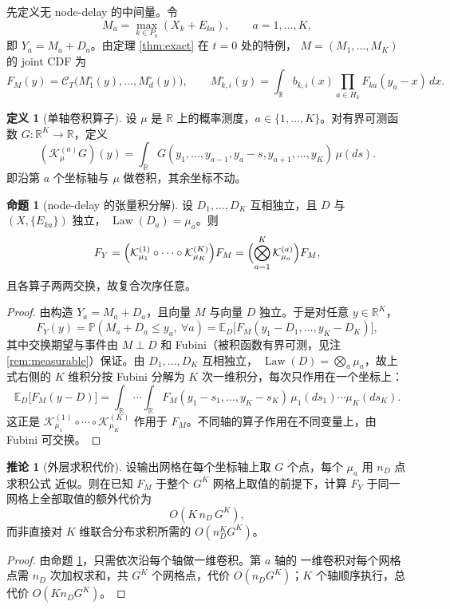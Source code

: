 \documentclass[a4paper,11pt]{article}
\theoremstyle{definition}
\newtheorem{corollary}{推论}
\newtheorem{proposition}{命题}
\newtheorem{definition}{定义}
\newcommand{\R}{\mathbb R}
\newcommand{\E}{\mathbb E}
\newcommand{\Prob}{\mathbb P}
\newcommand{\1}{\mathbf 1}
\newcommand{\Law}{\operatorname{Law}}
\begin{document}
先定义无 node-delay 的中间量。令
\[
M_a=\max_{k\in P_a}(X_k+E_{ka}),
\qquad a=1,\ldots,K,
\]
即 $Y_a=M_a+D_a$。由定理 \ref{thm:exact} 在 $t=0$ 处的特例，
$M=(M_1,\ldots,M_K)$ 的 joint CDF 为
\[
F_M(y)
=
\mathcal C_T\bigl(M_1^{\circ}(y),\ldots,M_d^{\circ}(y)\bigr),
\qquad
M_{k,i}^{\circ}(y)
=
\int_\R b_{k,i}(x)\prod_{a\in H_k}F_{ka}(y_a-x)\,dx.
\]

\begin{definition}[单轴卷积算子]
设 $\mu$ 是 $\R$ 上的概率测度，$a\in\{1,\ldots,K\}$。对有界可测函数
$G:\R^K\to\R$，定义
\[
(\mathcal K_\mu^{(a)}G)(y)
=
\int_\R G(y_1,\ldots,y_{a-1},y_a-s,y_{a+1},\ldots,y_K)\,\mu(ds).
\]
即沿第 $a$ 个坐标轴与 $\mu$ 做卷积，其余坐标不动。
\end{definition}

\begin{proposition}[node-delay 的张量积分解]
\label{prop:tensorconv}
设 $D_1,\ldots,D_K$ 互相独立，且 $D$ 与 $(X,\{E_{ka}\})$ 独立，
$\Law(D_a)=\mu_a$。则
\[
F_Y
=
\Bigl(\mathcal K_{\mu_1}^{(1)}\circ\cdots\circ\mathcal K_{\mu_K}^{(K)}\Bigr)F_M
=
\Bigl(\bigotimes_{a=1}^{K}\mathcal K_{\mu_a}^{(a)}\Bigr)F_M,
\]
且各算子两两交换，故复合次序任意。
\end{proposition}

\begin{proof}
由构造 $Y_a=M_a+D_a$，且向量 $M$ 与向量 $D$ 独立。于是对任意 $y\in\R^K$，
\[
F_Y(y)
=
\Prob(M_a+D_a\le y_a,\ \forall a)
=
\E_D\bigl[F_M(y_1-D_1,\ldots,y_K-D_K)\bigr],
\]
其中交换期望与事件由 $M\perp D$ 和 Fubini（被积函数有界可测，见注
\ref{rem:measurable}）保证。由 $D_1,\ldots,D_K$ 互相独立，
$\Law(D)=\bigotimes_a\mu_a$，故上式右侧的 $K$ 维积分按 Fubini 分解为
$K$ 次一维积分，每次只作用在一个坐标上：
\[
\E_D\bigl[F_M(y-D)\bigr]
=
\int_\R\cdots\int_\R F_M(y_1-s_1,\ldots,y_K-s_K)\,
\mu_1(ds_1)\cdots\mu_K(ds_K).
\]
这正是 $\mathcal K_{\mu_1}^{(1)}\circ\cdots\circ\mathcal K_{\mu_K}^{(K)}$
作用于 $F_M$。不同轴的算子作用在不同变量上，由 Fubini 可交换。
\end{proof}

\begin{corollary}[外层求积代价]
\label{cor:convcost}
设输出网格在每个坐标轴上取 $G$ 个点，每个 $\mu_a$ 用 $n_D$ 点求积公式
近似。则在已知 $F_M$ 于整个 $G^K$ 网格上取值的前提下，计算
$F_Y$ 于同一网格上全部取值的额外代价为
\[
O(K\,n_D\,G^K),
\]
而非直接对 $K$ 维联合分布求积所需的 $O(n_D^{K}G^K)$。
\end{corollary}

\begin{proof}
由命题 \ref{prop:tensorconv}，只需依次沿每个轴做一维卷积。第 $a$ 轴的
一维卷积对每个网格点需 $n_D$ 次加权求和，共 $G^K$ 个网格点，代价
$O(n_D G^K)$；$K$ 个轴顺序执行，总代价 $O(K n_D G^K)$。
\end{proof}
\end{document}

